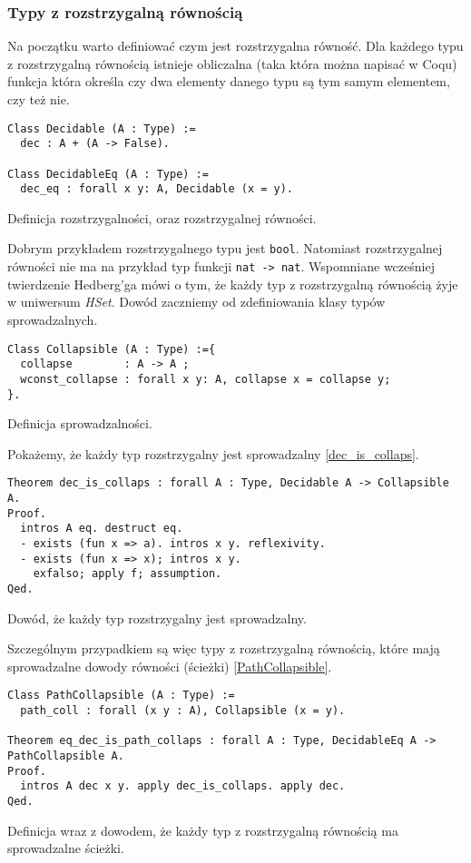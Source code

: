 \subsubsection{Typy z rozstrzygalną równością}
Na początku warto definiować czym jest rozstrzygalna równość. Dla każdego typu z rozstrzygalną równością istnieje obliczalna (taka która można napisać w Coqu) funkcja która określa czy dwa elementy danego typu są tym samym elementem, czy też nie. 
\begin{code}
\begin{verbatim}
Class Decidable (A : Type) :=
  dec : A + (A -> False).

Class DecidableEq (A : Type) :=
  dec_eq : forall x y: A, Decidable (x = y).
\end{verbatim}
\caption{Definicja rozstrzygalności, oraz rozstrzygalnej równości.}
\label{NType_incusion}
\end{code}
Dobrym przykładem rozstrzygalnego typu jest \texttt{bool}. Natomiast rozstrzygalnej równości nie ma na przykład typ funkcji \texttt{nat -> nat}. Wspomniane wcześniej twierdzenie Hedberg'ga \cite{hedberg_1998} mówi o tym, że każdy typ z rozstrzygalną równością żyje w uniwersum \emph{HSet}. Dowód zaczniemy od zdefiniowania klasy typów sprowadzalnych.
\begin{code}
\begin{verbatim}
Class Collapsible (A : Type) :={ 
  collapse        : A -> A ;
  wconst_collapse : forall x y: A, collapse x = collapse y;
}.
\end{verbatim}
\caption{Definicja sprowadzalności.}
\label{Collapsible}
\end{code}
Pokażemy, że każdy typ rozstrzygalny jest sprowadzalny \ref{dec_is_collaps}.
\begin{code}
\begin{verbatim}
Theorem dec_is_collaps : forall A : Type, Decidable A -> Collapsible A.
Proof.
  intros A eq. destruct eq.
  - exists (fun x => a). intros x y. reflexivity.
  - exists (fun x => x); intros x y.
    exfalso; apply f; assumption.
Qed.
\end{verbatim}
\caption{Dowód, że każdy typ rozstrzygalny jest sprowadzalny.}
\label{dec_is_collaps}
\end{code}
Szczególnym przypadkiem są więc typy z rozstrzygalną równością, które mają sprowadzalne dowody równości (ścieżki) \ref{PathCollapsible}.
\begin{code}
\begin{verbatim}
Class PathCollapsible (A : Type) :=
  path_coll : forall (x y : A), Collapsible (x = y).

Theorem eq_dec_is_path_collaps : forall A : Type, DecidableEq A -> PathCollapsible A.
Proof.
  intros A dec x y. apply dec_is_collaps. apply dec.
Qed.
\end{verbatim}
\caption{Definicja wraz z dowodem, że każdy typ z rozstrzygalną równością ma sprowadzalne ścieżki.}
\label{PathCollapsible}
\end{code}
